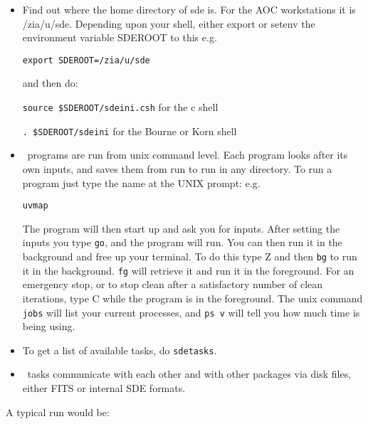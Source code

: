 \begin{itemize}
\item Find out where the home directory of sde  is. For the AOC 
workstations it is /zia/u/sde. Depending upon
your shell, either export or setenv the environment variable SDEROOT
to this e.g.

{\tt export SDEROOT=/zia/u/sde}

and then do:

{\tt source \$SDEROOT/sdeini.csh} for the c shell

{\tt . \$SDEROOT/sdeini} for the Bourne or Korn shell

\item \sde\ programs are run from unix command 
level. Each program looks after its own inputs, and saves them from
run to run in any directory. To run a program just type the name at
the UNIX prompt: e.g.

{\tt uvmap}

The program will then start up and ask you for inputs. After setting the
inputs you type {\tt go}, and the program will run.
You can then run it in the background and free up your terminal. To
do this type \caret Z and then {\tt bg} to run it in the background. {\tt fg} will
retrieve it and run it in the foreground. For an emergency stop, or
to stop clean after a satisfactory number of clean iterations, type
\caret C while the program is in the foreground. The unix command {\tt jobs}
will list your current processes, and {\tt ps v} will tell you how much time
is being using.
\item To get a list of available tasks, do {\tt sdetasks}.
\item \sde\ tasks communicate with each other and with other packages
via disk files, either FITS or internal SDE formats.
\end{itemize}

A typical run would be:

